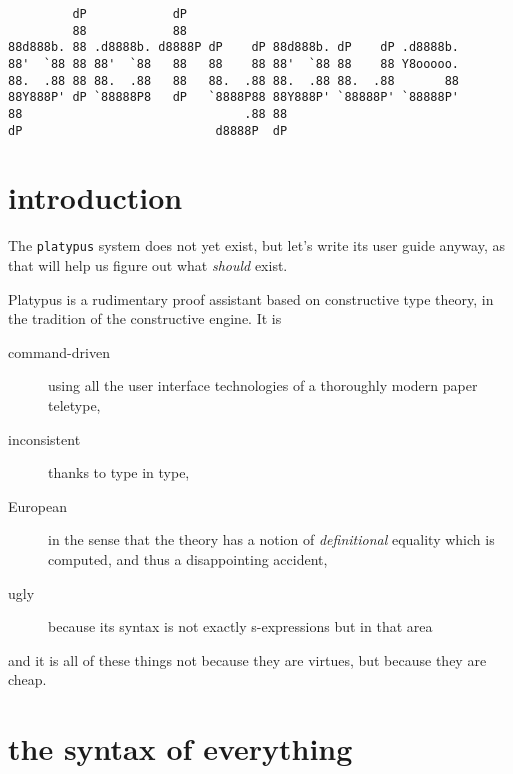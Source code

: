 \documentclass{article}
\begin{document}
\begin{verbatim}
         dP            dP                                       
         88            88                                       
88d888b. 88 .d8888b. d8888P dP    dP 88d888b. dP    dP .d8888b. 
88'  `88 88 88'  `88   88   88    88 88'  `88 88    88 Y8ooooo. 
88.  .88 88 88.  .88   88   88.  .88 88.  .88 88.  .88       88 
88Y888P' dP `88888P8   dP   `8888P88 88Y888P' `88888P' `88888P' 
88                               .88 88                         
dP                           d8888P  dP                         
\end{verbatim}


\vspace*{1in}

\section{introduction}

The {\tt platypus} system does not yet exist, but let's write its user guide anyway,
as that will help us figure out what \emph{should} exist.

Platypus is a rudimentary proof assistant based on constructive type theory, in the
tradition of the constructive engine. It is
\begin{description}
\item[command-driven] using all the user interface technologies of a thoroughly
  modern paper teletype,
\item[inconsistent] thanks to type in type,
\item[European] in the sense that the theory has a notion of \emph{definitional}
  equality which is computed, and thus a disappointing accident,
\item[ugly] because its syntax is not exactly s-expressions but in that area
\end{description}
and it is all of these things not because they are virtues, but because they are
cheap.


\section{the syntax of everything}
\end{document}

